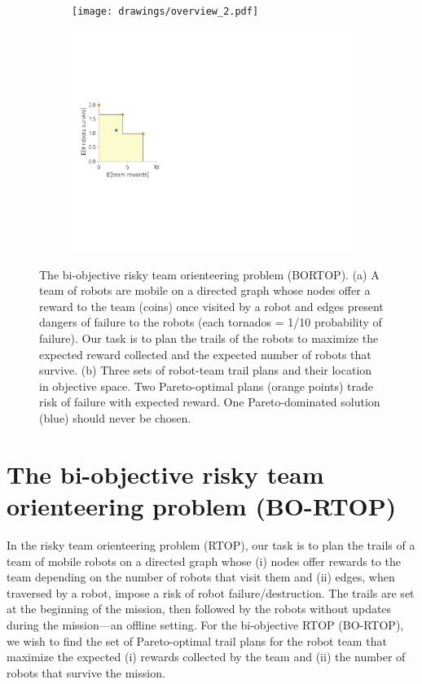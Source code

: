\documentclass[11pt, oneside]{article}
\begin{document}
\begin{figure}[h!]
    \centering
     \begin{subfigure}[b]{0.6\textwidth}
    	\texttt{[image: drawings/overview\_2.pdf]}
	\caption{} \label{fig:overview}
    \end{subfigure}
    \begin{subfigure}[b]{0.6\textwidth}
    	\includegraphics[width=\textwidth]{drawings/toy_pareto_front.pdf}
	\caption{} \label{fig:pareto_optimal}
    \end{subfigure}
    \caption{
      The bi-objective risky team orienteering problem (BORTOP). 
      (a) A team of robots are mobile on a directed graph whose nodes offer a reward to the team (coins) once visited by a robot and edges present dangers of failure to the robots (each tornados = 1/10 probability of failure). Our task is to plan the trails of the robots to maximize the expected reward collected and the expected number of robots that survive.
      (b) Three sets of robot-team trail plans and their location in objective space. Two Pareto-optimal plans (orange points) trade risk of failure with expected reward. One Pareto-dominated solution (blue) should never be chosen.
    }
\end{figure}



\section{The bi-objective risky team orienteering problem (BO-RTOP)}
In the risky team orienteering problem (RTOP), our task is to plan the trails of a team of mobile robots on a directed graph whose (i) nodes offer rewards to the team depending on the number of robots that visit them and (ii) edges, when traversed by a robot, impose a risk of robot failure/destruction.
The trails are set at the beginning of the mission, then followed by the robots without updates during the mission---an offline setting. 
For the bi-objective RTOP (BO-RTOP), we wish to find the set of Pareto-optimal trail plans for the robot team that maximize the expected (i) rewards collected by the team and (ii) the number of robots that survive the mission.
\end{document}
